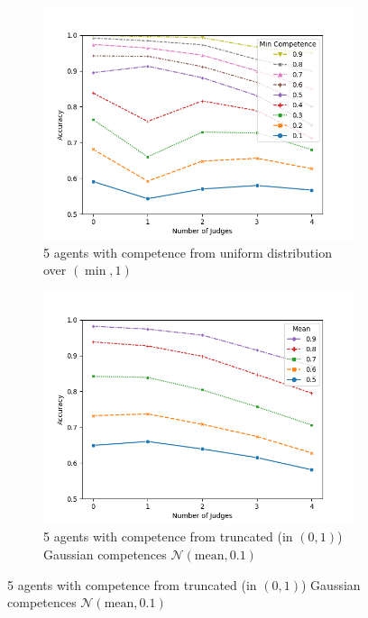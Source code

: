 \documentclass[letterpaper]{article} %
\begin{document}
\begin{figure}[t]
\centering
\begin{subfigure}{0.3\textwidth}
 \includegraphics[width=\textwidth]{./Figures/Experiment2_Uniform/Experiment2_uniform_5agents_numjudges_vs_accuracy_compare__mincompetences.png}
 \caption{5 agents with competence from uniform distribution over $(\min,1)$}
\label{fig:5_uniform}
\end{subfigure}
\hfill
\begin{subfigure}{0.3\textwidth}
 \includegraphics[width=\textwidth]{./Figures/Experiment2_Gaussian/Experiment2_gaussian_01sd_5agents_numjudges_vs_accuracy_compare_mean.png}
 \caption{5 agents with competence from truncated (in $(0,1)$) Gaussian competences $\mathcal{N}(\text{mean},0.1)$}

\end{subfigure}
\end{figure}
\end{document}
